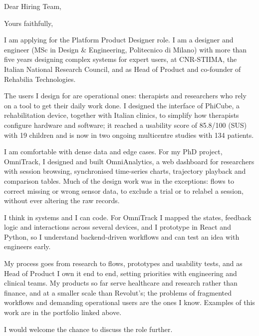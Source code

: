 \documentclass[11pt,a4paper,sans]{moderncv}
\begin{document}

\opening{Dear Hiring Team,}
\closing{Yours faithfully,}
\makelettertitle

I am applying for the Platform Product Designer role. I am a designer and engineer (MSc in Design \& Engineering, Politecnico di Milano) with more than five years designing complex systems for expert users, at CNR-STIIMA, the Italian National Research Council, and as Head of Product and co-founder of Rehabilia Technologies.

The users I design for are operational ones: therapists and researchers who rely on a tool to get their daily work done. I designed the interface of PhiCube, a rehabilitation device, together with Italian clinics, to simplify how therapists configure hardware and software; it reached a usability score of 85.8/100 (SUS) with 19 children and is now in two ongoing multicentre studies with 134 patients.

I am comfortable with dense data and edge cases. For my PhD project, OmniTrack, I designed and built OmniAnalytics, a web dashboard for researchers with session browsing, synchronised time-series charts, trajectory playback and comparison tables. Much of the design work was in the exceptions: flows to correct missing or wrong sensor data, to exclude a trial or to relabel a session, without ever altering the raw records.

I think in systems and I can code. For OmniTrack I mapped the states, feedback logic and interactions across several devices, and I prototype in React and Python, so I understand backend-driven workflows and can test an idea with engineers early.

My process goes from research to flows, prototypes and usability tests, and as Head of Product I own it end to end, setting priorities with engineering and clinical teams. My products so far serve healthcare and research rather than finance, and at a smaller scale than Revolut's; the problems of fragmented workflows and demanding operational users are the ones I know. Examples of this work are in the portfolio linked above.

I would welcome the chance to discuss the role further.

\makeletterclosing
\end{document}
